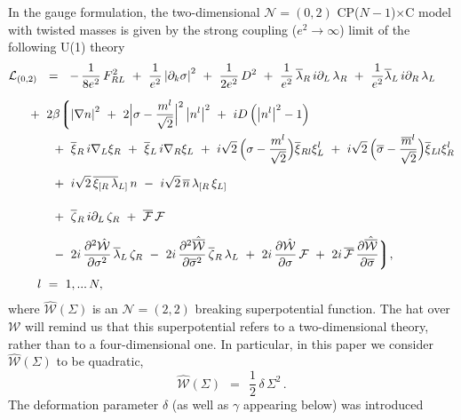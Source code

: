 \documentclass[12pt]{article}
\newcommand{\ntwot}{${\mathcal N}= \left(2,2\right) $ }
\newcommand{\ntwoo}{${\mathcal N}= \left(0,2\right) $ }
\newcommand{\p}{\partial}
\newcommand{\ov}{\overline}
\newcommand{\mc}[1]{\mathcal{#1}}
\newcommand{\bxir}{\ov{\xi}{}_R}
\newcommand{\bxil}{\ov{\xi}{}_L}
\newcommand{\xir}{\xi_R}
\newcommand{\xil}{\xi_L}
\newcommand{\bzr}{\ov{\zeta}{}_R}
\newcommand{\zr}{\zeta_R}
\newcommand{\nbar}{\ov{n}}
\newcommand{\CPC}{CP($N-1$)$\times$C }
\newcommand{\lar}{\lambda_R}
\newcommand{\lal}{\lambda_L}
\newcommand{\blar}{\ov{\lambda}{}_R}
\newcommand{\blal}{\ov{\lambda}{}_L}
\newcommand{\ff}{\mc{F}}
\newcommand{\bff}{\ov{\mc{F}}}
\begin{document}
In the gauge formulation, the two-dimensional
\ntwoo \CPC  model with twisted
masses  is given by the strong coupling ($ e^2\to\infty $) limit  of
the following U(1) theory
\begin{align}
\label{sigma_full}
% 
\notag
 	\mc{L}_\text{(0,2)} & ~~=~~
	-\,\frac{1}{8e^2}\,F_{RL}^2  ~+~ \frac{1}{e^2} \left|\p_k \sigma\right|^2 
	~+~ \frac{1}{2e^2}\, D^2
	~+~ \frac{1}{e^2}\, \blar\, i\p_L\, \lar  ~+~  \frac{1}{e^2} \blal\, i\p_R\, \lal
	\\[2mm]
%
\notag
	&
	\hspace{-0.4cm}
	~+~ 2\beta \biggl \lgroup
	\left| \nabla n \right|^2  ~+~ 2 \Bigl| \sigma - 
	\frac{m^l}{\sqrt{2}} \Bigr|^2 \left| n^l \right|^2
	~+~ iD \left( \left|n^l \right|^2 - 1 \right)
	\\
%
\notag
	&
	\hspace{-0.4cm}\phantom{2\beta\lgroup}
	~+~ \bxir\, i\nabla_L \xir  ~+~ \bxil\, i\nabla_R \xil ~+~
	i\sqrt{2}\, \Bigl( \sigma - \frac{m^l}{\sqrt{2}} \Bigr) \ov{\xi}{}_{Rl} \xi_L^l
	~+~ i\sqrt{2}\, \Bigl( \ov{\sigma} - \frac{\ov{m}{}^l}{\sqrt{2}} \Bigr) \ov{\xi}{}_{Ll} \xi_R^l
	\\[2mm]
%
	&
	\hspace{-0.4cm}\phantom{2\beta\lgroup}
	~+~ i\sqrt{2}\, \ov{\xi_{[R}\, \lambda}{}_{L]}\, n
	~-~ i\sqrt{2}\, \nbar\,  \lambda_{[R}\, \xi_{L]}
	\\[2mm]
%
\notag
	&
	\hspace{-0.4cm}\phantom{2\beta\lgroup}
	~+~ \bzr\, i\p_L\, \zr   ~+~   \bff\, \ff
	\\
%
\notag
	&
	\hspace{-0.4cm}\phantom{2\beta\lgroup}
	~-~ 2i\, \frac{\p^2 \hat{\mc{W}}}{\p \sigma^2}\, \blal\, \zr
	~-~ 2i\, \frac{\p^2 \hat{\ov{\mc{W}}}}{\p \ov{\sigma}{}^2}\, \bzr\, \lal
	~+~ 2i\, \frac{\p \hat{\mc{W}}}{\p \sigma}\, \ff
	~+~ 2i\, \bff\, \frac{\p \hat{\ov{\mc{W}}}}{\p \ov{\sigma}}
	\biggr\rgroup ,
	\\[1mm]
%
\notag
	&
	l~=~1,...\,N,
\end{align}
	where $ \hat{\mc{W}}(\Sigma) $ is an   \ntwot breaking superpotential 
	function. The hat over ${\mc{W}}$ will remind us that
	this superpotential refers to a two-dimensional theory, rather than to a four-dimensional one.
	In particular, in this paper we consider
$ \hat{\mc{W}}(\Sigma) $ to be   quadratic,
\[
	\hat{\mc{W}}(\Sigma) ~~=~~ \frac{1}{2}\, \delta\, \Sigma^2\,.
\]
The deformation parameter $\delta$ (as well as $\gamma$ appearing below)
was introduced 
\end{document}
